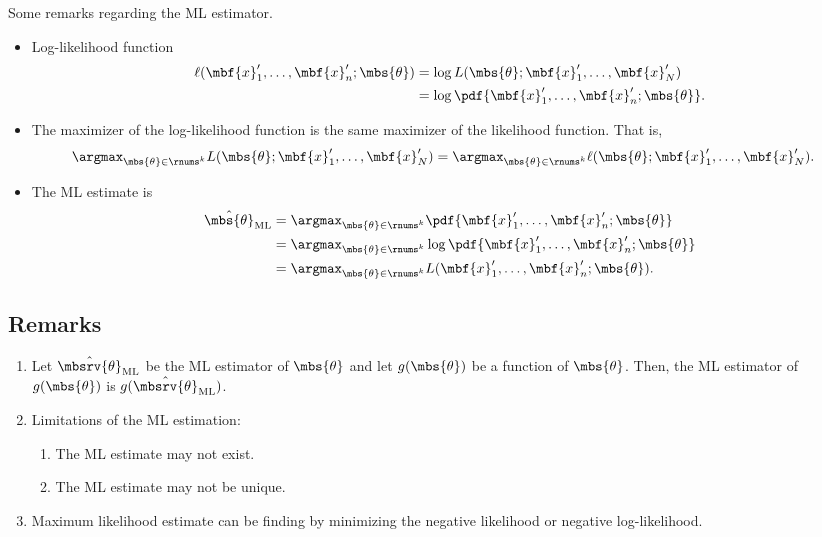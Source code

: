 \begin{myremark}
    Some remarks regarding the ML estimator.
    \begin{itemize}
        \item Log-likelihood function 
        \begin{align}
            \ell(\mbf{x}_{1}',\ldots,\mbf{x}_{n}';\mbs{\theta}) 
            &= \log L(\mbs{\theta}; \mbf{x}_{1}', \ldots, \mbf{x}_{N}')\\
            &= \log \pdf{\mbf{x}_{1}',\ldots, \mbf{x}_{n}';\mbs{\theta}}.
        \end{align}
        \item The maximizer of the log-likelihood function is the same maximizer of the likelihood function. That is,
        \begin{align}
            \argmax_{\mbs{\theta}\in\rnums^{k}} L(\mbs{\theta}; \mbf{x}_{1}', \ldots, \mbf{x}_{N}')
            &= \argmax_{\mbs{\theta}\in\rnums^{k}} \ell(\mbs{\theta}; \mbf{x}_{1}', \ldots, \mbf{x}_{N}').
        \end{align}
        \item The ML estimate is 
        \begin{align}
            \hat{\mbs{\theta}}_{\mathrm{ML}} 
            &= \argmax_{\mbs{\theta}\in\rnums^{k}} \pdf{\mbf{x}_{1}',\ldots, \mbf{x}_{n}';\mbs{\theta}}\\
            &= \argmax_{\mbs{\theta}\in\rnums^{k}} \log \pdf{\mbf{x}_{1}',\ldots, \mbf{x}_{n}';\mbs{\theta}}\\
            &= \argmax_{\mbs{\theta}\in\rnums^{k}} L(\mbf{x}_{1}',\ldots,\mbf{x}_{n}';\mbs{\theta}).
        \end{align}
    \end{itemize}
\end{myremark}

\subsection{Remarks}
\begin{enumerate}
    \item Let $\hat{\mbsrv{\theta}}_{\mathrm{ML}}$ be the ML estimator of $\mbs{\theta}$ and let $g(\mbs{\theta})$ be a function of $\mbs{\theta}$. Then, the ML estimator of $g(\mbs{\theta})$ is $g(\hat{\mbsrv{\theta}}_{\mathrm{ML}})$.
    
    \item Limitations of the ML estimation:
    \begin{enumerate}
        \item The ML estimate may not exist.
        \item The ML estimate may not be unique. 
    \end{enumerate}        
    
    \item Maximum likelihood estimate can be finding by minimizing the negative likelihood or negative log-likelihood.
\end{enumerate}

